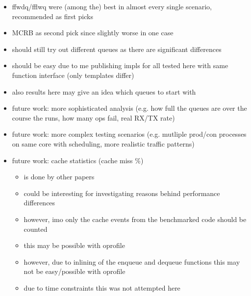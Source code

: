 \begin{itemize}
    \item ffwdq/fflwq were (among the) best in almost every single scenario, recommended as first picks
    \item MCRB as second pick since slightly worse in one case
    \item should still try out different queues as there are significant differences
    \item should be easy due to me publishing impls for all tested here with same function interface (only templates differ)
    \item also results here may give an idea which queues to start with

    \item future work: more sophisticated analysis (e.g. how full the queues are over the course the runs,
        how many ops fail, real RX/TX rate)
    \item future work: more complex testing scenarios (e.g. mutliple prod/con processes on same core with
        scheduling, more realistic traffic patterns)
    \item future work: cache statistics (cache miss \%)
        \begin{itemize}
            \item is done by other papers
            \item could be interesting for investigating reasons behind performance differences
            \item however, imo only the cache events from the benchmarked code should be counted
            \item this may be possible with oprofile
            \item however, due to inlining of the enqueue and dequeue functions this may not be easy/possible with oprofile
            \item due to time constraints this was not attempted here
        \end{itemize}
\end{itemize}
